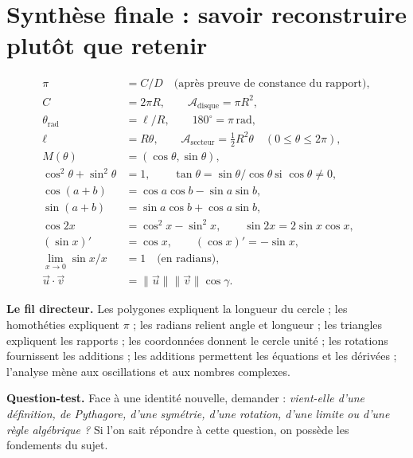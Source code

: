 \documentclass[../cours_spe_trigo.tex]{subfiles}
\begin{document}
\setcounter{chapter}{18}
\chapter{Synthèse finale : savoir reconstruire plutôt que retenir}
\begin{tcolorbox}[enhanced,colback=bleuPale,colframe=bleu,boxrule=.8pt,arc=1mm]
\begin{align*}
\pi&=C/D\quad\text{(après preuve de constance du rapport)},\\
C&=2\pi R,\qquad \mathcal A_{\mathrm{disque}}=\pi R^2,\\
\theta_{\mathrm{rad}}&=\ell/R,\qquad 180^\circ=\pi\,\mathrm{rad},\\
\ell&=R\theta,\qquad \mathcal A_{\mathrm{secteur}}=\tfrac12 R^2\theta\quad (0\le\theta\le2\pi),\\
M(\theta)&=(\cos\theta,\sin\theta),\\
\cos^2\theta+\sin^2\theta&=1,\qquad \tan\theta=\sin\theta/\cos\theta\ \text{si }\cos\theta\ne0,\\
\cos(a+b)&=\cos a\cos b-\sin a\sin b,\\
\sin(a+b)&=\sin a\cos b+\cos a\sin b,\\
\cos2x&=\cos^2x-\sin^2x,\qquad \sin2x=2\sin x\cos x,\\
(\sin x)'&=\cos x,\qquad(\cos x)'=-\sin x,\\
\lim_{x\to0}\sin x/x&=1\quad\text{(en radians)},\\
\vec u\cdot\vec v&=\|\vec u\|\|\vec v\|\cos\gamma.
\end{align*}
\end{tcolorbox}
\textbf{Le fil directeur.} Les polygones expliquent la longueur du cercle ; les homothéties expliquent $\pi$ ; les radians relient angle et longueur ; les triangles expliquent les rapports ; les coordonnées donnent le cercle unité ; les rotations fournissent les additions ; les additions permettent les équations et les dérivées ; l'analyse mène aux oscillations et aux nombres complexes.

\textbf{Question-test.} Face à une identité nouvelle, demander : \emph{vient-elle d'une définition, de Pythagore, d'une symétrie, d'une rotation, d'une limite ou d'une règle algébrique ?} Si l'on sait répondre à cette question, on possède les fondements du sujet.
\end{document}
